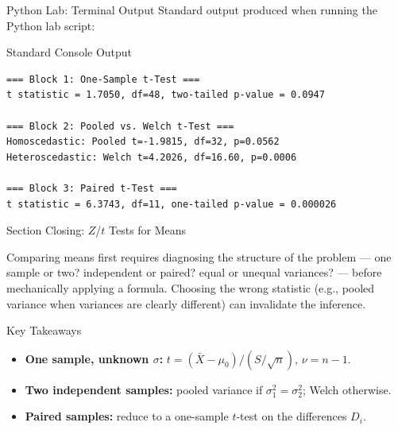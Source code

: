 \documentclass[10pt, aspectratio=169]{beamer}
\begin{document}
\begin{frame}[fragile]{Python Lab: Terminal Output}
  \scriptsize
  Standard output produced when running the Python lab script:
  \vspace{0.02cm}
  \begin{block}{Standard Console Output}
    \fontsize{4pt}{5pt}\selectfont
    \begin{verbatim}
=== Block 1: One-Sample t-Test ===
t statistic = 1.7050, df=48, two-tailed p-value = 0.0947

=== Block 2: Pooled vs. Welch t-Test ===
Homoscedastic: Pooled t=-1.9815, df=32, p=0.0562
Heteroscedastic: Welch t=4.2026, df=16.60, p=0.0006

=== Block 3: Paired t-Test ===
t statistic = 6.3743, df=11, one-tailed p-value = 0.000026
    \end{verbatim}
  \end{block}
\end{frame}


\begin{frame}{Section Closing: $Z$/$t$ Tests for Means}
  \begin{reflexion}
    Comparing means first requires diagnosing the structure of the problem --- one sample or two? independent or paired? equal or unequal variances? --- before mechanically applying a formula. Choosing the wrong statistic (e.g., pooled variance when variances are clearly different) can invalidate the inference.
  \end{reflexion}

  \vspace{0.2cm}
  \pause
  \begin{block}{Key Takeaways}
    \begin{itemize}\itemsep=0.08cm
      \item \textbf{One sample, unknown $\sigma$:} $t=(\bar X-\mu_0)/(S/\sqrt n)$, $\nu=n-1$.
      \item \textbf{Two independent samples:} pooled variance if $\sigma_1^2=\sigma_2^2$; Welch otherwise.
      \item \textbf{Paired samples:} reduce to a one-sample $t$-test on the differences $D_i$.
    \end{itemize}
  \end{block}
\end{frame}
\end{document}
